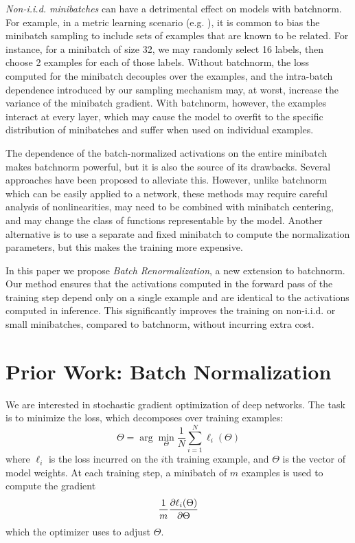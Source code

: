 {\em Non-i.i.d. minibatches} can have a detrimental effect on models with batchnorm. For example, in a metric learning scenario (e.g. \cite{nca}), it is common to bias the minibatch sampling to include sets of examples that are known to be related. For instance, for a minibatch of size 32, we may randomly select 16 labels, then choose 2 examples for each of those labels. Without batchnorm, the loss computed for the minibatch decouples over the examples, and the intra-batch dependence introduced by our sampling mechanism may, at worst, increase the variance of the minibatch gradient. With batchnorm, however, the examples interact at every layer, which may cause the model to overfit to the specific distribution of minibatches and suffer when used on individual examples.

The dependence of the batch-normalized activations on the entire minibatch makes batchnorm powerful, but it is also the source of its drawbacks. Several approaches \cite{weightnorm,layernorm,normprop} have been proposed to alleviate this. However, unlike batchnorm which can be easily applied to a network, these methods may require careful analysis of nonlinearities, may need to be combined with  minibatch centering, and may change the class of functions representable by the model. Another alternative \cite{gan} is to use a separate and fixed minibatch to compute the normalization parameters, but this makes the training more expensive.

In this paper we propose {\em Batch Renormalization}, a new extension to batchnorm. Our method ensures that the activations computed in the forward pass of the training step depend only on a single example and are identical to the activations computed in inference. This significantly improves the training on non-i.i.d. or small minibatches, compared to batchnorm, without incurring extra cost.

\section{Prior Work: Batch Normalization}

We are interested in stochastic gradient optimization of deep networks. The task is to minimize the loss, which decomposes over training examples:
$$\Theta = \arg \min_\Theta
\frac{1}{N}\sum_{i=1}^N \ell_i(\Theta)$$
where $\ell_i$ is the loss incurred on the $i$th training example, and $\Theta$ is the vector of model weights. At each training step, a minibatch of $m$ examples is used to compute the  gradient
$$\frac{1}{m} \frac{\partial  \ell_i(\Theta)}{\partial  \Theta}$$
which the optimizer uses to adjust $\Theta$.

